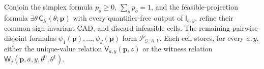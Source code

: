 Conjoin the simplex formula \(p_o\geq0\), \(\sum_op_o=1\), and the feasible-projection formula \(\exists\theta\,\mathsf C_{\mathcal G}(\theta;\mathbf p)\) with every quantifier-free output of \(\mathsf I_{a,y}\), refine their common sign-invariant CAD, and discard infeasible cells. The remaining pairwise-disjoint formulas \(\psi_1(\mathbf p),\ldots,\psi_J(\mathbf p)\) form \(\mathscr P_{\mathcal G,A,Y}\). Each cell stores, for every \(a,y\), either the unique-value relation \(\mathsf V_{a,y}(\mathbf p,z)\) or the witness relation \(\mathsf W_j(\mathbf p,a,y,\theta^0,\theta^1)\).
